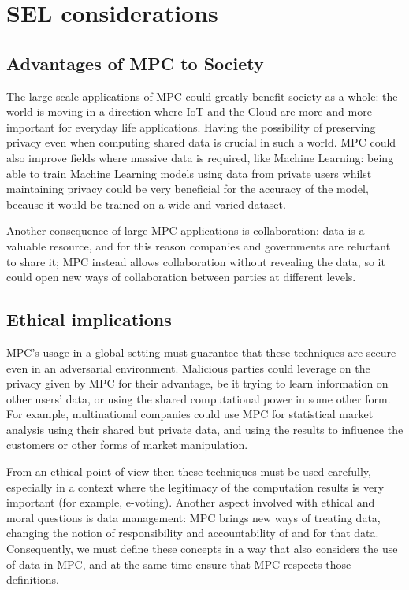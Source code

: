 \section{SEL considerations}\label{sec:sel}

\subsection{Advantages of MPC to Society}

The large scale applications of MPC could greatly benefit society as a whole: the world is moving in a direction where IoT and the Cloud are more and more important for everyday life applications. Having the possibility of preserving privacy even when computing shared data is crucial in such a world. MPC could also improve fields where massive data is required, like Machine Learning: being able to train Machine Learning models using data from private users whilst maintaining privacy could be very beneficial for the accuracy of the model, because it would be trained on a wide and varied dataset.

Another consequence of large MPC applications is collaboration: data is a valuable resource, and for this reason companies and governments are reluctant to share it; MPC instead allows collaboration without revealing the data, so it could open new ways of collaboration between parties at different levels.

\subsection{Ethical implications}

MPC's usage in a global setting must guarantee that these techniques are secure even in an adversarial environment. Malicious parties could leverage on the privacy given by MPC for their advantage, be it trying to learn information on other users' data, or using the shared computational power in some other form. For example, multinational companies could use MPC for statistical market analysis using their shared but private data, and using the results to influence the customers or other forms of market manipulation.

From an ethical point of view then these techniques must be used carefully, especially in a context where the legitimacy of the computation results is very important (for example, e-voting). Another aspect involved with ethical and moral questions is data management: MPC brings new ways of treating data, changing the notion of responsibility and accountability of and for that data. Consequently, we must define these concepts in a way that also considers the use of data in MPC, and at the same time ensure that MPC respects those definitions.


